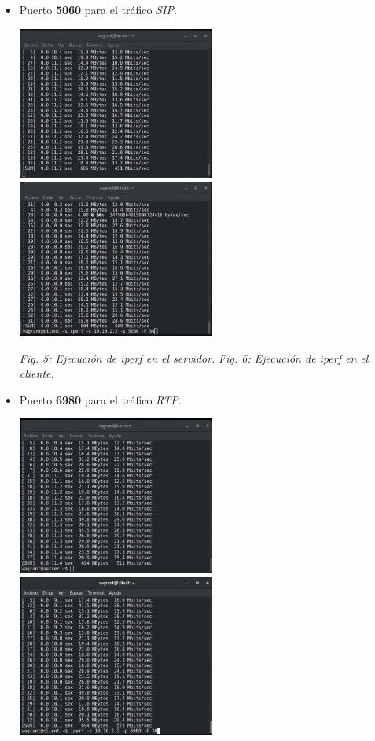 \documentclass[11pt]{article}
\begin{document}
\begin{itemize}
\newpage
\item Puerto \textbf{5060} para el tráfico \textit{SIP}.
\begin{center}
\includegraphics[width=6.5cm]{puerto5060Server.jpg}
\hspace{0.5cm}
\includegraphics[width=6.5cm]{puerto5060Client.jpg}
\end{center}

\begin{center}
\textit{Fig. 5: Ejecución de \textit{iperf} en el \textit{servidor}.}
\hspace{0.5cm}
\textit{Fig. 6: Ejecución de \textit{iperf} en el \textit{cliente}.}
\end{center}

\item Puerto \textbf{6980} para el tráfico \textit{RTP}.
\begin{center}
\includegraphics[width=6.5cm]{puerto6980Server.jpg}
\hspace{0.5cm}
\includegraphics[width=6.5cm]{puerto6980Client.jpg}
\end{center}


\end{itemize}
\end{document}
